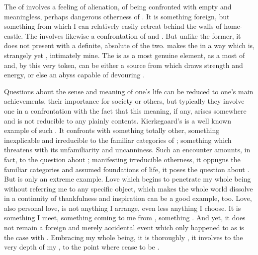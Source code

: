 The  of  involves a feeling of
alienation, of being confronted with empty and meaningless, perhaps dangerous
otherness of .  It is something foreign, but something from which I
can relatively easily retreat behind the walls of  home-castle.  The
 involves likewise a confrontation of  and
.  But unlike the former, it does not present  with a
definite, absolute  of the two.  
makes the   in a way which is, strangely yet
, intimately mine.  The  is  as a most genuine
element, as a most  of  and, by this very token,
can be either a source from which  draws strength and energy, or
else an abyss capable of devouring .

Questions about the sense and meaning of one's life can be reduced to one's main
achievements, their importance for society or others, but typically they involve
one in a confrontation with the fact that this meaning, if any, arises somewhere
 and is not reducible to any plainly  contents.
Kierkegaard's  is a well known example of such .  It
confronts  with something totally other, something inexplicable and
irreducible to the familiar categories of ; something which
threatens  with its unfamiliarity and uncanniness. Such an encounter
amounts, in fact, to the question about ; manifesting irreducible
otherness, it oppugns the familiar categories and assumed foundations of 
life, it poses the question about . But  is only an extreme
example.  Love which begins to penetrate my whole being without referring me to
any specific object, which makes the whole world dissolve in a continuity of
thankfulness and inspiration can be a good example, too.  Love, also personal
love, is not anything I arrange, even less anything I choose.  It is something I
meet, something coming to me from , something . And yet,
it does not remain a foreign and merely accidental event which only happened to
 as is the case with . Embracing my whole being,
it is thoroughly , it involves  to the very depth of my
, to the point where  cease to be .

